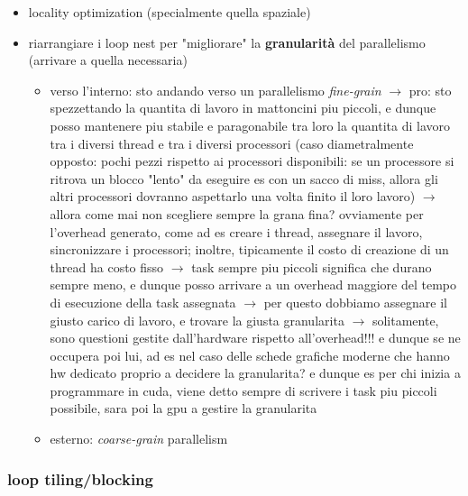 \begin{itemize}
  \item locality optimization (specialmente quella spaziale)
  \item riarrangiare i loop nest per "migliorare" la \textbf{granularit\`a} del parallelismo (arrivare a quella necessaria)
  \begin{itemize}
    \item verso l'interno: sto andando verso un parallelismo \textit{fine-grain} $\rightarrow$ pro: sto spezzettando la quantita di lavoro in mattoncini piu piccoli, e dunque posso mantenere piu stabile e paragonabile tra loro la quantita di lavoro tra i diversi thread e tra i diversi processori (caso diametralmente opposto: pochi pezzi rispetto ai processori disponibili: se un processore si ritrova un blocco "lento" da eseguire es con un sacco di miss, allora gli altri processori dovranno aspettarlo una volta finito il loro lavoro) $\rightarrow$ allora come mai non scegliere sempre la grana fina? ovviamente per l'overhead generato, come ad es creare i thread, assegnare il lavoro, sincronizzare i processori; inoltre, tipicamente il costo di creazione di un thread ha costo fisso $\rightarrow$ task sempre piu piccoli significa che durano sempre meno, e dunque posso arrivare a un overhead maggiore del tempo di esecuzione della task assegnata $\rightarrow$ per questo dobbiamo assegnare il giusto carico di lavoro, e trovare la giusta granularita $\rightarrow$ solitamente, sono questioni gestite dall'hardware rispetto all'overhead!!! e dunque se ne occupera poi lui, ad es nel caso delle schede grafiche moderne che hanno hw dedicato proprio a decidere la granularita? e dunque es per chi inizia a programmare in cuda, viene detto sempre di scrivere i task piu piccoli possibile, sara poi la gpu a gestire la granularita
    \item esterno: \textit{coarse-grain} parallelism
  \end{itemize}
  
\end{itemize}

\subsubsection{loop tiling/blocking}

